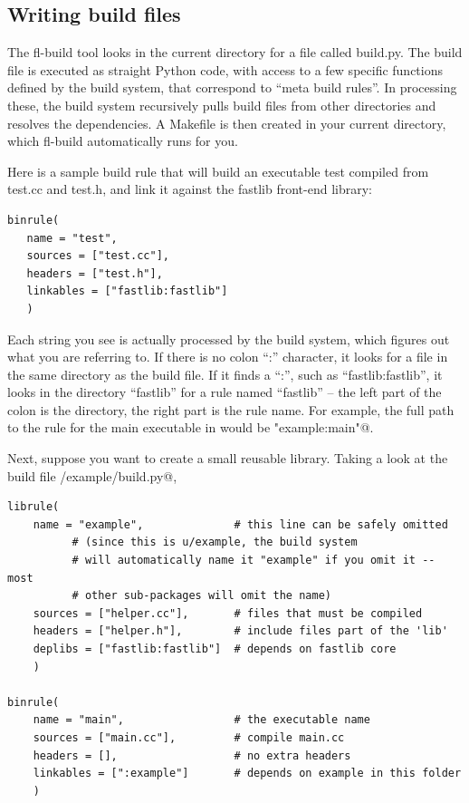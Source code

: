 \documentclass[letter]{report}
\begin{document}
\subsection{Writing build files}

The fl-build tool looks in the current directory for a file called build.py. The build file is executed as straight Python code, with access to a few specific functions defined by the build system, that correspond to ``meta build rules''. In processing these, the build system recursively pulls build files from other directories and resolves the dependencies. A Makefile is then created in your current directory, which fl-build automatically runs for you.

Here is a sample build rule that will build an executable test compiled from test.cc and test.h, and link it against the fastlib front-end library:
\begin{verbatim}
binrule(
   name = "test",
   sources = ["test.cc"],
   headers = ["test.h"],
   linkables = ["fastlib:fastlib"]
   )
\end{verbatim}
Each string you see is actually processed by the build system, which figures out what you are referring to. If there is no colon ``:'' character, it looks for a file in the same directory as the build file. If it finds a ``:'', such as ``fastlib:fastlib'', it looks in the directory ``fastlib'' for a rule named ``fastlib'' -- the left part of the colon is the directory, the right part is the rule name. For example, the full path to the rule for the main executable in \verb@example@ would be \verb@"example:main"@.

Next, suppose you want to create a small reusable library. Taking a look at the build file \verb@u/example/build.py@,
\begin{verbatim}
librule(
    name = "example",              # this line can be safely omitted
          # (since this is u/example, the build system
          # will automatically name it "example" if you omit it -- most
          # other sub-packages will omit the name)
    sources = ["helper.cc"],       # files that must be compiled
    headers = ["helper.h"],        # include files part of the 'lib'
    deplibs = ["fastlib:fastlib"]  # depends on fastlib core
    )

binrule(
    name = "main",                 # the executable name
    sources = ["main.cc"],         # compile main.cc
    headers = [],                  # no extra headers
    linkables = [":example"]       # depends on example in this folder
    )
\end{verbatim}
\end{document}

